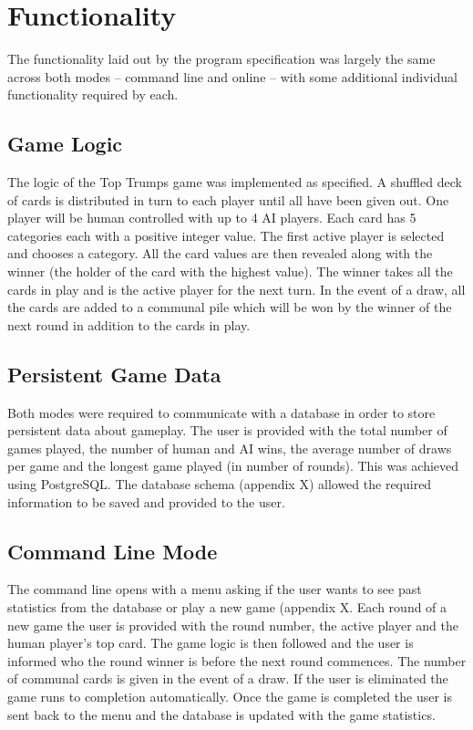 \newpage
\section{Functionality}
The functionality laid out by the program specification was largely the same across both modes -- command line and online -- with some additional individual functionality required by each.

\subsection{Game Logic}
The logic of the Top Trumps game was implemented as specified. A shuffled deck of cards is distributed in turn to each player until all have been given out. One player will be human controlled with up to 4 AI players. Each card has 5 categories each with a positive integer value. The first active player is selected and chooses a category. All the card values are then revealed along with the winner (the holder of the card with the highest value). The winner takes all the cards in play and is the active player for the next turn. In the event of a draw, all the cards are added to a communal pile which will be won by the winner of the next round in addition to the cards in play.

\subsection{Persistent Game Data}
Both modes were required to communicate with a database in order to store persistent data about gameplay. The user is provided with the total number of games played, the number of human and AI wins, the average number of draws per game and the longest game played (in number of rounds). This was achieved using PostgreSQL. The database schema (appendix X) allowed the required information to be saved and provided to the user. 

\subsection{Command Line Mode}
The command line opens with a menu asking if the user wants to see past statistics from the database or play a new game (appendix X. Each round of a new game the user is provided with the round number, the active player and the human player's top card. The game logic is then followed and the user is informed who the round winner is before the next round commences. The number of communal cards is given in the event of a draw. If the user is eliminated the game runs to completion automatically. Once the game is completed the user is sent back to the menu and the database is updated with the game statistics. \\

